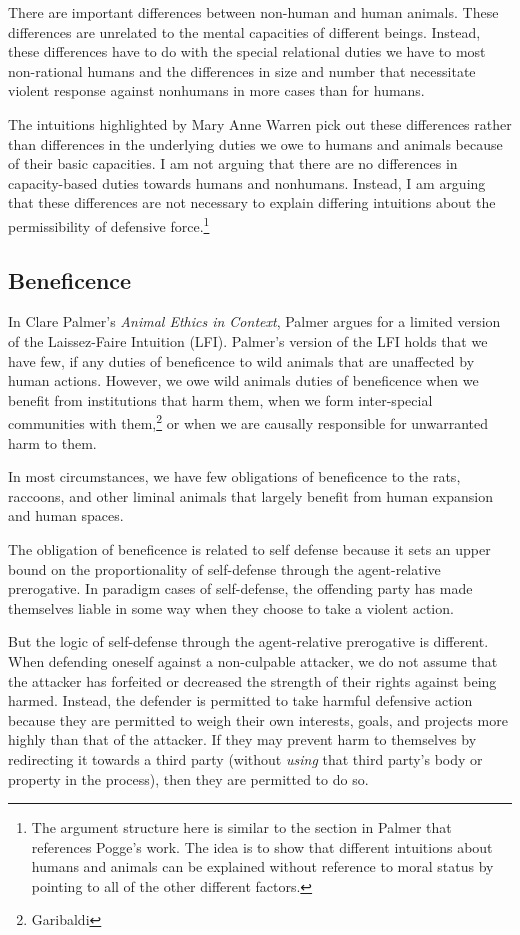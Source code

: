     There are important differences between non-human and human animals.
    These differences are unrelated to the mental capacities of different
    beings. Instead, these differences have to do with the special relational
    duties we have to most non-rational humans and the differences in size and
    number that necessitate violent response against nonhumans in more cases
    than for humans.

	The intuitions highlighted by Mary Anne Warren pick out these differences
	rather than differences in the underlying duties we owe to humans and
	animals because of their basic capacities. I am not arguing that there are
	no differences in capacity-based duties towards humans and nonhumans.
	Instead, I am arguing that these differences are not necessary to explain
	differing intuitions about the permissibility of defensive
	force.\footnote{The argument structure here is similar to the section in
		Palmer that references Pogge’s work. The idea is to show that different
	intuitions about humans and animals can be explained without reference to
	moral status by pointing to all of the other different factors.}

    \subsection{Beneficence}

		In Clare Palmer’s \emph{Animal Ethics in Context}, Palmer argues for a
		limited version of the Laissez-Faire Intuition (LFI). Palmer’s version
		of the LFI holds that we have few, if any duties of beneficence to wild
		animals that are unaffected by human actions. However, we owe wild
		animals duties of beneficence when we benefit from institutions that
		harm them, when we form inter-special communities with
		them,\footnote{Garibaldi} or when we are causally responsible for
		unwarranted harm to them.

		In most circumstances, we have few obligations of beneficence to the
		rats, raccoons, and other liminal animals that largely benefit from
		human expansion and human spaces.

		The obligation of beneficence is related to self defense because it sets
		an upper bound on the proportionality of self-defense through the
		agent-relative prerogative. In paradigm cases of self-defense, the
		offending party has made themselves liable in some way when they choose
		to take a violent action.

		But the logic of self-defense through the agent-relative prerogative is
		different. When defending oneself against a non-culpable attacker, we do
		not assume that the attacker has forfeited or decreased the strength
		of their rights against being harmed. Instead, the defender is
		permitted to take harmful defensive action because they are permitted
		to weigh their own interests, goals, and projects more highly than that
		of the attacker. If they may prevent harm to themselves by redirecting
		it towards a third party (without \emph{using} that third party’s body
		or property in the process), then they are permitted to do so.

